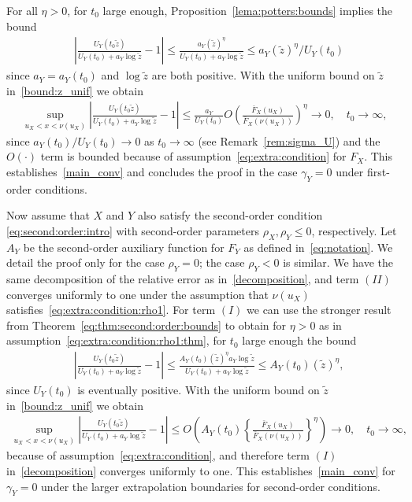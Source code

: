 \documentclass{statsoc}
\theoremstyle{break}
\begin{document}
For all $\eta > 0$, for $t_0$ large enough, Proposition~\ref{lema:potters:bounds} implies the bound
\begin{align*}
	&\left|\frac{U_Y(t_0 \tilde z)}{ U_Y(t_0) + a_Y \log \tilde z}  - 1  \right| \leq \frac{a_Y (\tilde z)^\eta}{U_Y(t_0) + a_Y \log \tilde z} \leq  a_Y (\tilde z)^\eta/U_Y(t_0) 
\end{align*}
since $a_Y = a_Y(t_0)$ and $\log\tilde z$ are both positive. With the uniform bound on $\tilde z$ in~\eqref{bound:z_unif} we obtain
\begin{align*}
	\sup_{ u_X  <  x < \nu(u_X) } \left|\frac{U_Y(t_0 \tilde z)}{ U_Y(t_0) + a_Y \log \tilde z}  - 1  \right|  \leq \frac{a_Y}{U_Y(t_0)}O\left(\frac{\bar F_X(u_X)}{\bar F_X(\nu(u_X))} \right)^\eta \to 0, \quad t_0 \to\infty,	
\end{align*}
since $a_Y(t_0)/U_Y(t_0) \to 0$ as $t_0\to\infty$ (see Remark~\ref{rem:sigma_U}) 
and the $O(\cdot)$ term is bounded because of assumption~\eqref{eq:extra:condition} for $F_X$.
This establishes~\eqref{main_conv} and concludes the proof in the case $\gamma_Y = 0$ under first-order conditions.

Now assume that $X$ and $Y$ also satisfy the second-order condition \eqref{eq:second:order:intro} 
with second-order parameters $\rho_X,\rho_Y \leq 0$, respectively.
Let $A_Y$ be the second-order auxiliary function for $F_Y$ as defined in~\eqref{eq:notation}.
We detail the proof only for the case $\rho_Y = 0$; the case $\rho_Y < 0$ is similar. 
We have the same decomposition of the relative error as in~\eqref{decomposition}, and term $(II)$ converges uniformly to one under the assumption that $\nu(u_X)$ satisfies~\eqref{eq:extra:condition:rho1}. 
For term $(I)$ we can use the stronger result from Theorem~\ref{eq:thm:second:order:bounds} 
to obtain for $\eta > 0$ as in assumption~\eqref{eq:extra:condition:rho1:thm}, 
for $t_0$ large enough the bound
\begin{align*}
	&\left|\frac{U_Y(t_0 \tilde z)}{ U_Y(t_0) + a_Y \log \tilde z}  - 1  \right| \leq 
	\frac{ A_Y(t_0)  (\tilde z)^\eta a_Y\log \tilde z}{U_Y(t_0) + a_Y \log \tilde z} \leq  A_Y(t_0)(\tilde z)^\eta, 
\end{align*}
since $U_Y(t_0)$ is eventually positive. With the uniform bound on $\tilde z$ in~\eqref{bound:z_unif} we obtain
\begin{align}\label{eq:second:orderI}
	\sup_{ u_X  <  x < \nu(u_X) } \left|\frac{U_Y(t_0 \tilde z)}{ U_Y(t_0) + a_Y \log \tilde z}  - 1  \right|  \leq O\left(A_Y(t_0)\left\{\frac{\bar F_X(u_X)}{\bar F_X(\nu(u_X))}\right\}^\eta \right) \to 0, \quad t_0 \to\infty,	
\end{align}
because of assumption~\eqref{eq:extra:condition}, and therefore term $(I)$ in~\eqref{decomposition} converges uniformly to one.
This establishes~\eqref{main_conv} for $\gamma_Y = 0$ under the larger extrapolation 
boundaries for second-order conditions.
\end{document}

